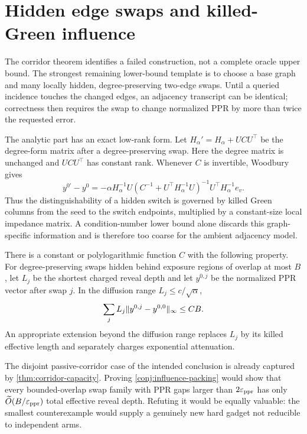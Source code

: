 \section{Hidden edge swaps and killed-Green influence}
\label{sec:green-influence}

The corridor theorem identifies a failed construction, not a complete oracle
upper bound.  The strongest remaining lower-bound template is to choose a
base graph and many locally hidden, degree-preserving two-edge swaps.  Until a
queried incidence touches the changed edges, an adjacency transcript can be
identical; correctness then requires the swap to change normalized PPR by
more than twice the requested error.

The analytic part has an exact low-rank form.  Let
$H_\alpha'=H_\alpha+UCU^\top$ be the degree-form matrix after a
degree-preserving swap.  Here the degree matrix is unchanged and $UCU^\top$
has constant rank.  Whenever $C$ is invertible, Woodbury gives
\begin{equation}
 y^{0\prime}-y^0
 =-\alpha H_\alpha^{-1}U
   \left(C^{-1}+U^\top H_\alpha^{-1}U\right)^{-1}
   U^\top H_\alpha^{-1}e_v.
 \label{eq:swap-woodbury}
\end{equation}
Thus the distinguishability of a hidden switch is governed by killed Green
columns from the seed to the switch endpoints, multiplied by a constant-size
local impedance matrix.  A condition-number lower bound alone discards this
graph-specific information and is therefore too coarse for the ambient
adjacency model.

\begin{conjecture}
\label{conj:influence-packing}
There is a constant or polylogarithmic function $C$ with the following
property.  For degree-preserving swaps hidden behind exposure regions of
overlap at most $B$, let $L_j$ be the shortest charged reveal depth and let
$y^{0,j}$ be the normalized PPR vector after swap $j$.  In the diffusion
range $L_j\leq c/\sqrt\alpha$,
\begin{equation}
 \sum_j L_j
   \lVert y^{0,j}-y^{0,0}\rVert_\infty
 \leq C B.
 \label{eq:influence-packing-conjecture}
\end{equation}
An appropriate extension beyond the diffusion range replaces $L_j$ by its
killed effective length and separately charges exponential attenuation.
\end{conjecture}

The disjoint passive-corridor case of the intended conclusion is already
captured by \cref{thm:corridor-capacity}.  Proving
\cref{conj:influence-packing} would show that every bounded-overlap swap
family with PPR gaps larger than $2\varepsilon_{\mathrm{ppr}}$ has only
$\widetilde O(B/\varepsilon_{\mathrm{ppr}})$ total effective reveal depth.  Refuting it would be
equally valuable: the smallest counterexample would supply a genuinely new
hard gadget not reducible to independent arms.

